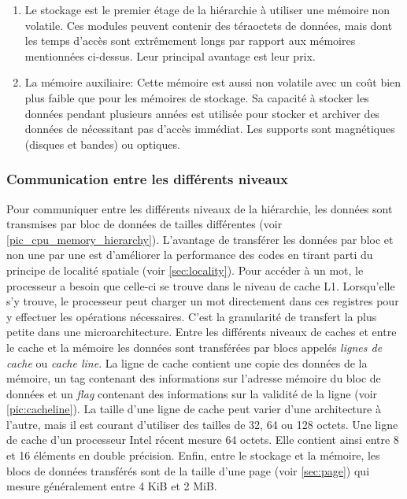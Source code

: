 \begin{enumerate}
    \item Le stockage est le premier étage de la hiérarchie à utiliser une mémoire non volatile. Ces modules peuvent contenir des téraoctets de données, mais dont les temps d'accès sont extrêmement longs par rapport aux mémoires mentionnées ci-dessus. Leur principal avantage est leur prix.
    
    \item La mémoire auxiliaire: Cette mémoire est aussi non volatile avec un coût bien plus faible que pour les mémoires de stockage. Sa capacité à stocker les données pendant plusieurs années est utilisée pour stocker et archiver des données de nécessitant pas d'accès immédiat. Les supports sont magnétiques (disques et bandes) ou optiques.

\end{enumerate}

\subsubsection{Communication entre les différents niveaux}
Pour communiquer entre les différents niveaux de la hiérarchie, les données sont transmises par bloc de données de tailles différentes (voir \autoref{pic_cpu_memory_hierarchy}). L'avantage de transférer les données par bloc et non une par une est d'améliorer la performance des codes en tirant parti du principe de localité spatiale (voir \autoref{sec:locality}).
Pour accéder à un mot, le processeur a besoin que celle-ci se trouve dans le niveau de cache L1. Lorsqu'elle s’y trouve, le processeur peut charger un mot directement dans ces registres pour y effectuer les opérations nécessaires. C'est la granularité de transfert la plus petite dans une microarchitecture. Entre les différents niveaux de caches et entre le cache et la mémoire les données sont transférées par blocs appelés \textit{lignes de cache} ou \textit{cache line}. La ligne de cache contient une copie des données de la mémoire, un tag contenant des informations sur l'adresse mémoire du bloc de données et un \textit{flag} contenant des informations sur la validité de la ligne (voir \autoref{pic:cacheline}). La taille d'une ligne de cache peut varier d'une architecture à l'autre, mais il est courant d'utiliser des tailles de 32, 64 ou 128 octets. Une ligne de cache d'un processeur Intel récent mesure 64 octets. Elle contient ainsi entre 8 et 16 éléments en double précision. Enfin, entre le stockage et la mémoire, les blocs de données transférés sont de la taille d'une page (voir \autoref{sec:page}) qui mesure généralement entre 4 KiB et 2 MiB.

